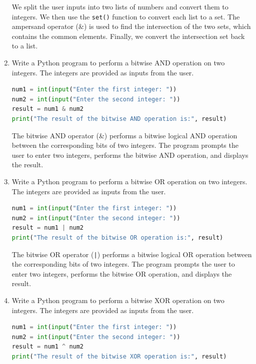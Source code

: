 \documentclass[12pt]{book}
\begin{document}
\begin{enumerate}
    We split the user inputs into two lists of numbers and convert them to integers. We then use the \texttt{set()} function to convert each list to a set. The ampersand operator (\&) is used to find the intersection of the two sets, which contains the common elements. Finally, we convert the intersection set back to a list.
    
    \item Write a Python program to perform a bitwise AND operation on two integers. The integers are provided as inputs from the user.

\begin{lstlisting}[language=Python]
num1 = int(input("Enter the first integer: "))
num2 = int(input("Enter the second integer: "))
result = num1 & num2
print("The result of the bitwise AND operation is:", result)
\end{lstlisting}

The bitwise AND operator (&) performs a bitwise logical AND operation between the corresponding bits of two integers. The program prompts the user to enter two integers, performs the bitwise AND operation, and displays the result.

\item Write a Python program to perform a bitwise OR operation on two integers. The integers are provided as inputs from the user.

\begin{lstlisting}[language=Python]
num1 = int(input("Enter the first integer: "))
num2 = int(input("Enter the second integer: "))
result = num1 | num2
print("The result of the bitwise OR operation is:", result)
\end{lstlisting}

The bitwise OR operator (\texttt{|}) performs a bitwise logical OR operation between the corresponding bits of two integers. The program prompts the user to enter two integers, performs the bitwise OR operation, and displays the result.

\item Write a Python program to perform a bitwise XOR operation on two integers. The integers are provided as inputs from the user.

\begin{lstlisting}[language=Python]
num1 = int(input("Enter the first integer: "))
num2 = int(input("Enter the second integer: "))
result = num1 ^ num2
print("The result of the bitwise XOR operation is:", result)
\end{lstlisting}


\end{enumerate}
\end{document}
